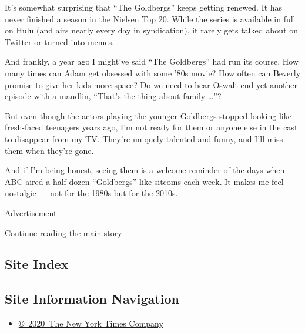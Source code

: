 It's somewhat surprising that ``The Goldbergs'' keeps getting renewed.
It has never finished a season in the Nielsen Top 20. While the series
is available in full on Hulu (and airs nearly every day in syndication),
it rarely gets talked about on Twitter or turned into memes.

And frankly, a year ago I might've said ``The Goldbergs'' had run its
course. How many times can Adam get obsessed with some '80s movie? How
often can Beverly promise to give her kids more space? Do we need to
hear Oswalt end yet another episode with a maudlin, ``That's the thing
about family \ldots{}''?

But even though the actors playing the younger Goldbergs stopped looking
like fresh-faced teenagers years ago, I'm not ready for them or anyone
else in the cast to disappear from my TV. They're uniquely talented and
funny, and I'll miss them when they're gone.

And if I'm being honest, seeing them is a welcome reminder of the days
when ABC aired a half-dozen ``Goldbergs''-like sitcoms each week. It
makes me feel nostalgic --- not for the 1980s but for the 2010s.

Advertisement

\protect\hyperlink{after-bottom}{Continue reading the main story}

\hypertarget{site-index}{%
\subsection{Site Index}\label{site-index}}

\hypertarget{site-information-navigation}{%
\subsection{Site Information
Navigation}\label{site-information-navigation}}

\begin{itemize}
\tightlist
\item
  \href{https://help.nytimes.com/hc/en-us/articles/115014792127-Copyright-notice}{©~2020~The
  New York Times Company}
\end{itemize}

